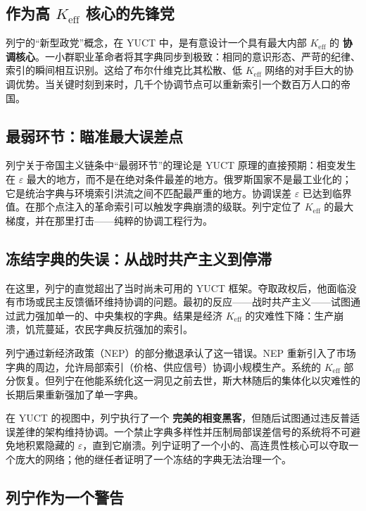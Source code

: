\documentclass[12pt,a4paper]{article}
\newcommand{\Keff}{K_{\mathrm{eff}}}
\begin{document}
	\subsection{作为高 \(K_{\mathrm{eff}}\) 核心的先锋党}
	
	列宁的“新型政党”概念，在 YUCT 中，是有意设计一个具有最大内部 \(K_{\mathrm{eff}}\) 的 \textbf{协调核心}。一小群职业革命者将其字典同步到极致：相同的意识形态、严苛的纪律、索引的瞬间相互识别。这给了布尔什维克比其松散、低 \(K_{\mathrm{eff}}\) 网络的对手巨大的协调优势。当关键时刻到来时，几千个协调节点可以重新索引一个数百万人口的帝国。
	
	\subsection{最弱环节：瞄准最大误差点}
	
	列宁关于帝国主义链条中“最弱环节”的理论是 YUCT 原理的直接预期：相变发生在 \(\varepsilon\) 最大的地方，而不是在绝对条件最差的地方。俄罗斯国家不是最工业化的；它是统治字典与环境索引洪流之间不匹配最严重的地方。协调误差 \(\varepsilon\) 已达到临界值。在那个点注入的革命索引可以触发字典崩溃的级联。列宁定位了 \(\Keff\) 的最大梯度，并在那里打击——纯粹的协调工程行为。
	
	\subsection{冻结字典的失误：从战时共产主义到停滞}
	
	在这里，列宁的直觉超出了当时尚未可用的 YUCT 框架。夺取政权后，他面临没有市场或民主反馈循环维持协调的问题。最初的反应——战时共产主义——试图通过武力强加单一的、中央集权的字典。结果是经济 \(\Keff\) 的灾难性下降：生产崩溃，饥荒蔓延，农民字典反抗强加的索引。
	
	列宁通过新经济政策（NEP）的部分撤退承认了这一错误。NEP 重新引入了市场字典的周边，允许局部索引（价格、供应信号）协调小规模生产。系统的 \(\Keff\) 部分恢复。但列宁在他能系统化这一洞见之前去世，斯大林随后的集体化以灾难性的长期后果重新强加了单一字典。
	
	在 YUCT 的视图中，列宁执行了一个 \textbf{完美的相变黑客}，但随后试图通过违反普适误差律的架构维持协调。一个禁止字典多样性并压制局部误差信号的系统将不可避免地积累隐藏的 \(\varepsilon\)，直到它崩溃。列宁证明了一个小的、高连贯性核心可以夺取一个庞大的网络；他的继任者证明了一个冻结的字典无法治理一个。
	
	\subsection{列宁作为一个警告}
	
\end{document}

